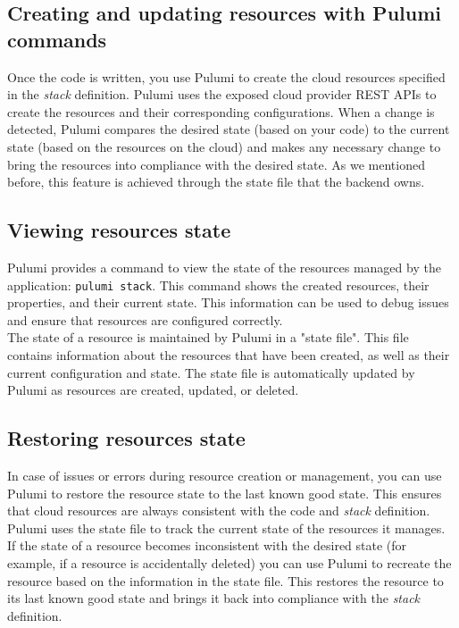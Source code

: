 \subsection{Creating and updating resources with Pulumi commands}
Once the code is written, you use Pulumi to create the cloud resources specified in the \textit{stack} definition.
Pulumi uses the exposed cloud provider REST APIs to create the resources and their corresponding configurations. 
When a change is detected, Pulumi compares the desired state (based on your code) to the current state (based on the resources on the cloud) and makes any necessary change to bring the resources into compliance with the desired state.
As we mentioned before, this feature is achieved through the state file that the backend owns.

\subsection{Viewing resources state}
Pulumi provides a command to view the state of the resources managed by the application: \texttt{pulumi stack}.
This command shows the created resources, their properties, and their current state. 
This information can be used to debug issues and ensure that resources are configured correctly.\\
The state of a resource is maintained by Pulumi in a "state file".
This file contains information about the resources that have been created, as well as their current configuration and state.
The state file is automatically updated by Pulumi as resources are created, updated, or deleted.

\subsection{Restoring resources state}
In case of issues or errors during resource creation or management, you can use Pulumi to restore the resource state to the last known good state.
This ensures that cloud resources are always consistent with the code and \textit{stack} definition.\\
Pulumi uses the state file to track the current state of the resources it manages.
If the state of a resource becomes inconsistent with the desired state (for example, if a resource is accidentally deleted) you can use Pulumi to recreate the resource based on the information in the state file.
This restores the resource to its last known good state and brings it back into compliance with the \textit{stack} definition.

